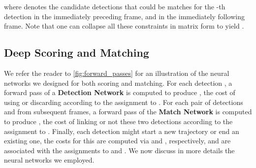 \documentclass[letterpaper, 10 pt, conference]{ieeeconf}  \pdfminorversion=4
\begin{document}
where  denotes the candidate detections that could be matches for the -th  detection  in the immediately preceding frame, and   in the immediately following frame.
Note that one can collapse all these constraints in matrix form to yield  .



\subsection{Deep Scoring and Matching}
\label{sec:deep_scoring}

We refer the reader to \autoref{fig:forward_passes} for an illustration of the neural networks we designed for both scoring and matching. For each detection , a forward pass of a \textbf{Detection Network} is computed to produce , the cost of using or discarding  according to the assignment to . For each pair of detections  and  from subsequent frames, a forward pass of the \textbf{Match Network} is computed to produce , the cost of linking or not these two detections according to the assignment to . Finally, each detection might start a new trajectory or end an existing one, the costs for this are computed via  and , respectively, and are associated with the assignments to  and .
We now discuss in more details the neural networks we employed.
\end{document}

